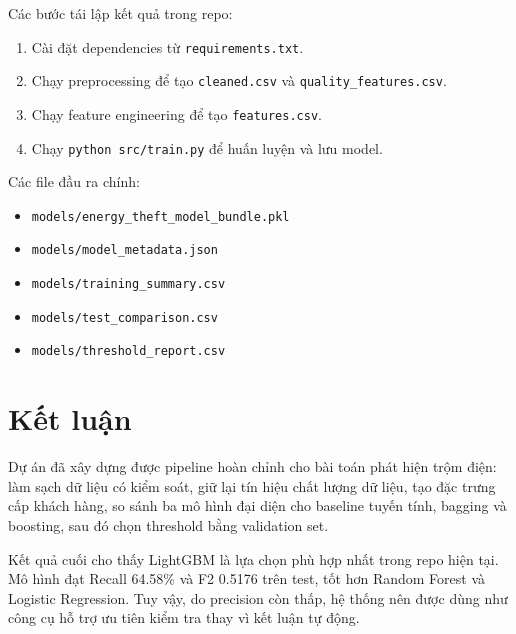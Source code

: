 \documentclass[12pt,a4paper]{article}
\begin{document}
Các bước tái lập kết quả trong repo:

\begin{enumerate}
    \item Cài đặt dependencies từ \texttt{requirements.txt}.
    \item Chạy preprocessing để tạo \texttt{cleaned.csv} và \texttt{quality\_features.csv}.
    \item Chạy feature engineering để tạo \texttt{features.csv}.
    \item Chạy \texttt{python src/train.py} để huấn luyện và lưu model.
\end{enumerate}

Các file đầu ra chính:
\begin{itemize}
    \item \texttt{models/energy\_theft\_model\_bundle.pkl}
    \item \texttt{models/model\_metadata.json}
    \item \texttt{models/training\_summary.csv}
    \item \texttt{models/test\_comparison.csv}
    \item \texttt{models/threshold\_report.csv}
\end{itemize}

\section{Kết luận}

Dự án đã xây dựng được pipeline hoàn chỉnh cho bài toán phát hiện trộm điện: làm sạch dữ liệu có kiểm soát, giữ lại tín hiệu chất lượng dữ liệu, tạo đặc trưng cấp khách hàng, so sánh ba mô hình đại diện cho baseline tuyến tính, bagging và boosting, sau đó chọn threshold bằng validation set.

Kết quả cuối cho thấy LightGBM là lựa chọn phù hợp nhất trong repo hiện tại. Mô hình đạt Recall 64.58\% và F2 0.5176 trên test, tốt hơn Random Forest và Logistic Regression. Tuy vậy, do precision còn thấp, hệ thống nên được dùng như công cụ hỗ trợ ưu tiên kiểm tra thay vì kết luận tự động.
\end{document}
